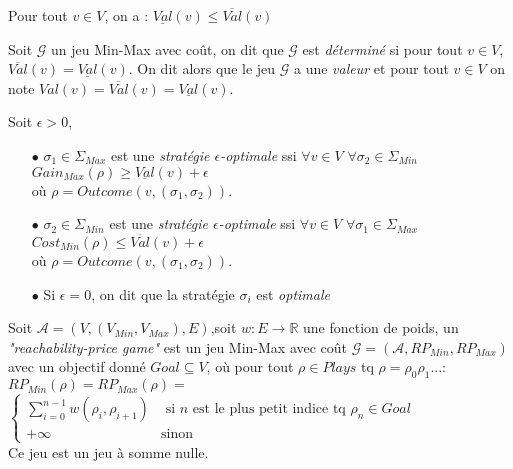 \begin{propriete}
	Pour tout $v \in V$, on a : $\underline{Val}(v) \leq \overline{Val}(v)$
\end{propriete}


\begin{defi}
		Soit $\mathcal{G}$ un jeu Min-Max avec coût, on dit que $\mathcal{G}$ est \textit{déterminé} si pour tout $v \in V$, $\overline{Val}(v) = \underline{Val}(v)$. On dit alors que le jeu $\mathcal{G}$ a une \textit{valeur} et pour tout $v \in V$ on note $Val(v) = \overline{Val}(v) = \underline{Val}(v)$.
\end{defi}


\begin{defi}
	Soit $\epsilon > 0$,
	\begin{enumerate}
	\item[$\bullet$] $\sigma _{1} \in \Sigma _{Max}$ est une \textit{stratégie $\epsilon$-optimale} ssi $\forall v \in V $ $ \forall \sigma _{2}\in \Sigma_{Min}$ $ Gain_{Max}(\rho) \geq \underline{Val}(v) + \epsilon  $\\ où $\rho = Outcome(v, (\sigma _{1},\sigma _{2}))$.
	\item[$\bullet$] $\sigma _{2} \in \Sigma _{Min}$ est une \textit{stratégie $\epsilon$-optimale} ssi $\forall v \in V $ $ \forall \sigma _{1}\in \Sigma_{Max}$ $Cost_{Min}(\rho) \leq \overline{Val}(v) + \epsilon $\\ où $\rho = Outcome(v, (\sigma _{1},\sigma _{2}))$.
	\item[$\bullet$] Si $\epsilon = 0$, on dit que la stratégie $\sigma _{i}$ est \textit{optimale}
	\end{enumerate}
\end{defi}


\begin{defi}
	Soit $\mathcal{A} = (V, (V_{Min}, V_{Max}), E) $,soit $w: E \rightarrow \mathbb{R}$ une fonction de poids,
	un \textit{"reachability-price game"} est un jeu Min-Max avec coût $\mathcal{G} = (\mathcal{A},RP_{Min},RP_{Max})$\\ avec un objectif donné $Goal \subseteq V$, où pour tout $\rho \in Plays$ tq $\rho = \rho _{0}\rho _{1}...$:\\
	
	$RP_{Min}(\rho)=RP_{Max}(\rho) =$ $\begin{cases}
									\sum_{i = 0}^{n-1} w(\rho_{i},\rho_{i+1}) & \text{ si } n \text{ est le plus petit indice tq } \rho_{n}\in 					  Goal\\
									+\infty & \text{sinon}
									\end{cases}$ \\
									
  \noindent Ce jeu est un jeu à somme nulle.
\end{defi}

